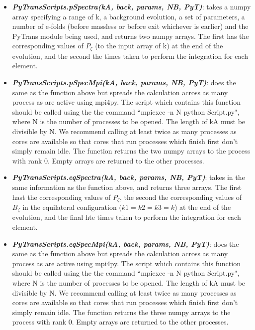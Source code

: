 \documentclass[10pt,
amsmath,amssymb,
aps,prd,nofootinbib,eqsecnum,a4paper]{revtex4}
\begin{document}
\begin{itemize}
\item { \it \bf PyTransScripts.pSpectra(kA, back, params, NB, PyT)}: takes a numpy array specifying  a range of k, a background evolution, a set of parameters, a number of e-folds (before massless or before exit whichever is earlier) and the PyTrans module being used, and returns two numpy arrays. The first has the corresponding values of $P_\zeta$ (to the input array of k) at the end of the evolution, and the second the times taken to perform the integration for each element.

\item { \it \bf PyTransScripts.pSpecMpi(kA, back, params, NB, PyT)}: does the same as the function above but spreads the calculation across as many process as are active using mpi4py. The script which contains this function should be called using the the command ``mpiexec -n N python Script.py", where N is the number of processes to be opened. The length of kA must be divisible by N. We recommend calling at least twice as many processes as cores are available so that cores that run processes which finish first don't simply remain idle.  The function returns the two numpy arrays to the process with rank 0. Empty arrays are returned to the other processes. 


\item { \it \bf PyTransScripts.eqSpectra(kA, back, params, NB, PyT)}: takes in the same information as the function above, and returns three arrays. The first hast the corresponding values of $P_\zeta$, the second the corresponding values of $B_\zeta$ in the equilateral configuration ($k1=k2=k3=k$) at the end of the evolution, and the final hte times taken to perform the integration for each element.


\item { \it \bf PyTransScripts.eqSpecMpi(kA, back, params, NB, PyT)}: does the same as the function above but spreads the calculation across as many process as are active using mpi4py. The script which contains this function should be called using the the command ``mpiexec -n N python Script.py", where N is the number of processes to be opened. The length of kA must be divisible by N. We recommend calling at least twice as many processes as cores are available so that cores that run processes which finish first don't simply remain idle.  The function returns the three numpy arrays to the process with rank 0. Empty arrays are returned to the other processes. 



\end{itemize}
\end{document}
